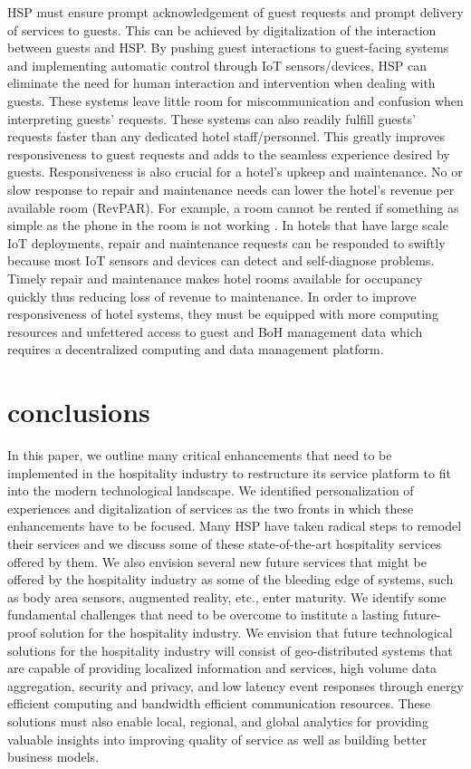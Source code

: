 \documentclass[10pt,journal,letterpaper]{IEEEtran}
\begin{document}
{HSP must ensure prompt acknowledgement of guest requests and prompt delivery of services to guests. This can be achieved by digitalization of the interaction between guests and HSP. By pushing guest interactions to guest-facing systems and implementing automatic control through IoT sensors/devices, HSP can eliminate the need for human interaction and intervention when dealing with guests. These systems leave little room for miscommunication and confusion when interpreting guests' requests. These systems can also readily fulfill guests' requests faster than any dedicated hotel staff/personnel. This greatly improves responsiveness to guest requests and adds to the seamless experience desired by guests. Responsiveness is also crucial for a hotel's upkeep and maintenance. No or slow response to repair and maintenance needs can lower the hotel's revenue per available room (RevPAR). For example, a room cannot be rented if something as simple as the phone in the room is not working \cite{Altin_RevPAR_2017}. In hotels that have large scale IoT deployments, repair and maintenance requests can be responded to swiftly because most IoT sensors and devices can detect and self-diagnose problems. Timely repair and maintenance makes hotel rooms available for occupancy quickly thus reducing loss of revenue to maintenance. In order to improve responsiveness of hotel systems, they must be equipped with more computing resources and unfettered access to guest and BoH management data which requires a decentralized computing and data management platform.
%
%
\section{conclusions}
\label{section_conclusions}
In this paper, we outline many critical enhancements that need to be implemented in the hospitality industry to restructure its service platform to fit into the modern technological landscape. We identified personalization of experiences and digitalization of services as the two fronts in which these enhancements have to be focused. Many HSP have taken radical steps to remodel their services and we discuss some of these state-of-the-art hospitality services offered by them. We also envision several new future services that might be offered by the hospitality industry as some of the bleeding edge of systems, such as body area sensors, augmented reality, etc., enter maturity. We identify some fundamental challenges that need to be overcome to institute a lasting future-proof solution for the hospitality industry. We envision that future technological solutions for the hospitality industry will consist of geo-distributed systems that are capable of providing localized information and services, high volume data aggregation, security and privacy, and low latency event responses through energy efficient computing and bandwidth efficient communication resources. These solutions must also enable local, regional, and global analytics for providing valuable insights into improving quality of service as well as building better business models.

}
\end{document}
